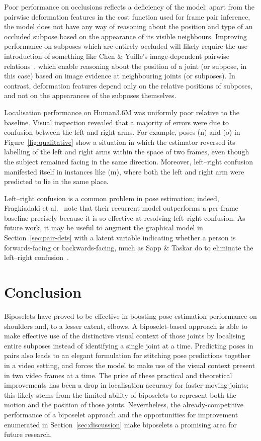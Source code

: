 \documentclass[runningheads]{llncs}
\begin{document}
Poor performance on occlusions reflects a deficiency of the model: apart from
the pairwise deformation features in the cost function used for frame pair
inference, the model does not have any way of reasoning about the position and
type of an occluded subpose based on the appearance of its visible neighbours.
Improving performance on subposes which are entirely occluded will likely
require the use introduction of something like Chen \& Yuille's image-dependent
pairwise relations~\cite{chen2014articulated}, which enable reasoning about the
position of a joint (or subpose, in this case) based on image evidence at
neighbouring joints (or subposes). In contrast, deformation features depend only
on the relative positions of subposes, and not on the appearances of the
subposes themselves.

Localisation performance on Human3.6M was uniformly poor relative to the
baseline. Visual inspection revealed that a majority of errors were due to
confusion between the left and right arms. For example, poses (n) and (o) in
Figure~\ref{fig:qualitative} show a situation in which the estimator reversed
its labelling of the left and right arms within the space of two frames, even
though the subject remained facing in the same direction. Moreover, left--right
confusion manifested itself in instances like (m), where both the left and right
arm were predicted to lie in the same place.

Left--right confusion is a common problem in pose estimation; indeed,
Fragkiadaki et al.~\cite{fragkiadaki2015recurrent} note that their recurrent
model outperforms a per-frame baseline precisely because it is so effective at
resolving left--right confusion. As future work, it may be useful to augment the
graphical model in Section~\ref{sec:pair-dets} with a latent variable indicating
whether a person is forwards-facing or backwards-facing, much as Sapp \& Taskar
do to eliminate the left--right confusion~\cite{sapp2013modec}.

\section{Conclusion}

Biposelets have proved to be effective in boosting pose estimation performance
on shoulders and, to a lesser extent, elbows. A biposelet-based approach is able
to make effective use of the distinctive visual context of those joints by
localising entire subposes instead of identifying a single joint at a time.
Predicting poses in pairs also leads to an elegant formulation for stitching
pose predictions together in a video setting, and forces the model to make use
of the visual context present in two video frames at a time. The price of
these practical and theoretical improvements has been a drop in localisation
accuracy for faster-moving joints; this likely stems from the limited ability of
biposelets to represent both the motion and the position of those joints.
Nevertheless, the already-competitive performance of a biposelet approach and
the opportunities for improvement enumerated in Section~\ref{sec:discussion}
make biposelets a promising area for future research.
\end{document}
